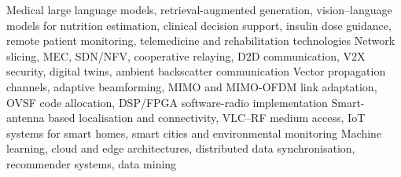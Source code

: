 
\begin{cvskills}
    {Medical large language models, retrieval-augmented generation, vision--language models for nutrition estimation, clinical decision support, insulin dose guidance, remote patient monitoring, telemedicine and rehabilitation technologies}
    {Network slicing, MEC, SDN/NFV, cooperative relaying, D2D communication, V2X security, digital twins, ambient backscatter communication}
    {Vector propagation channels, adaptive beamforming, MIMO and MIMO-OFDM link adaptation, OVSF code allocation, DSP/FPGA software-radio implementation}
    {Smart-antenna based localisation and connectivity, VLC--RF medium access, IoT systems for smart homes, smart cities and environmental monitoring}
    {Machine learning, cloud and edge architectures, distributed data synchronisation, recommender systems, data mining}
\end{cvskills}
